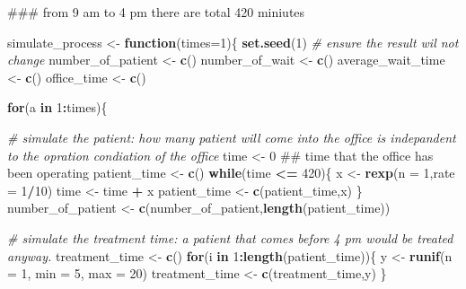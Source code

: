 \documentclass[]{article}
\newenvironment{Shaded}{\begin{snugshade}}{\end{snugshade}}
\newcommand{\KeywordTok}[1]{\textcolor[rgb]{0.13,0.29,0.53}{\textbf{#1}}}
\newcommand{\DataTypeTok}[1]{\textcolor[rgb]{0.13,0.29,0.53}{#1}}
\newcommand{\DecValTok}[1]{\textcolor[rgb]{0.00,0.00,0.81}{#1}}
\newcommand{\StringTok}[1]{\textcolor[rgb]{0.31,0.60,0.02}{#1}}
\newcommand{\CommentTok}[1]{\textcolor[rgb]{0.56,0.35,0.01}{\textit{#1}}}
\newcommand{\ControlFlowTok}[1]{\textcolor[rgb]{0.13,0.29,0.53}{\textbf{#1}}}
\newcommand{\OperatorTok}[1]{\textcolor[rgb]{0.81,0.36,0.00}{\textbf{#1}}}
\newcommand{\NormalTok}[1]{#1}
\begin{document}
\begin{Shaded}
\begin{Highlighting}[]
\NormalTok{### from 9 am to 4 pm there are total 420 miniutes}

\NormalTok{simulate_process <-}\StringTok{ }\ControlFlowTok{function}\NormalTok{(}\DataTypeTok{times=}\DecValTok{1}\NormalTok{)\{}
        \KeywordTok{set.seed}\NormalTok{(}\DecValTok{1}\NormalTok{)  }\CommentTok{# ensure the result wil not change}
\NormalTok{        number_of_patient <-}\StringTok{ }\KeywordTok{c}\NormalTok{()}
\NormalTok{        number_of_wait <-}\StringTok{ }\KeywordTok{c}\NormalTok{()}
\NormalTok{        average_wait_time <-}\StringTok{ }\KeywordTok{c}\NormalTok{()}
\NormalTok{        office_time <-}\StringTok{ }\KeywordTok{c}\NormalTok{()}
        
        \ControlFlowTok{for}\NormalTok{(a }\ControlFlowTok{in} \DecValTok{1}\OperatorTok{:}\NormalTok{times)\{}
        
        \CommentTok{# simulate the patient: how many patient will come into the office is indepandent to the opration condiation of the office}
\NormalTok{        time <-}\StringTok{ }\DecValTok{0}\NormalTok{ ## time that the office has been operating}
\NormalTok{        patient_time <-}\StringTok{ }\KeywordTok{c}\NormalTok{()}
        \ControlFlowTok{while}\NormalTok{(time }\OperatorTok{<=}\StringTok{ }\DecValTok{420}\NormalTok{)\{}
\NormalTok{                x <-}\StringTok{ }\KeywordTok{rexp}\NormalTok{(}\DataTypeTok{n =} \DecValTok{1}\NormalTok{,}\DataTypeTok{rate =} \DecValTok{1}\OperatorTok{/}\DecValTok{10}\NormalTok{)}
\NormalTok{                time <-}\StringTok{ }\NormalTok{time }\OperatorTok{+}\StringTok{ }\NormalTok{x}
\NormalTok{                patient_time <-}\StringTok{ }\KeywordTok{c}\NormalTok{(patient_time,x)}
\NormalTok{        \}}
\NormalTok{        number_of_patient <-}\StringTok{ }\KeywordTok{c}\NormalTok{(number_of_patient,}\KeywordTok{length}\NormalTok{(patient_time))}
        
        \CommentTok{# simulate the treatment time: a patient that comes before 4 pm would be treated anyway.}
\NormalTok{        treatment_time <-}\StringTok{ }\KeywordTok{c}\NormalTok{()}
        \ControlFlowTok{for}\NormalTok{(i }\ControlFlowTok{in} \DecValTok{1}\OperatorTok{:}\KeywordTok{length}\NormalTok{(patient_time))\{}
\NormalTok{                y <-}\StringTok{ }\KeywordTok{runif}\NormalTok{(}\DataTypeTok{n =} \DecValTok{1}\NormalTok{, }\DataTypeTok{min =} \DecValTok{5}\NormalTok{, }\DataTypeTok{max =} \DecValTok{20}\NormalTok{)}
\NormalTok{                treatment_time <-}\StringTok{ }\KeywordTok{c}\NormalTok{(treatment_time,y)}
\NormalTok{        \}}
        

\end{Highlighting}
\end{Shaded}
\end{document}
